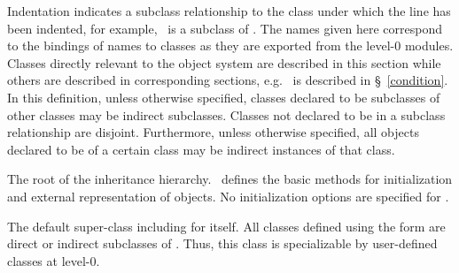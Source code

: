\begin{optDefinition}
\begin{table}
{\begin{tabbing}
    \>\>\>\\
    \> \\
    \>\>\\
    \>\>\\
    \> \\
    \>\>%
\end{tabbing}%
}%
\end{table}%
%
Indentation indicates a subclass relationship to the class under which the line
has been indented, for example, \ is a subclass of
.  The names given here correspond to the bindings of names to
classes as they are exported from the level-0 modules.  Classes directly
relevant to the object system are described in this section while others are
described in corresponding sections, e.g. \ is described in
\S~\ref{condition}.
%
In this definition, unless otherwise specified, classes declared to be
subclasses of other classes may be indirect subclasses. Classes not declared to
be in a subclass relationship are disjoint.  Furthermore, unless otherwise
specified, all objects declared to be of a certain class may be indirect
instances of that class.

%
The root of the inheritance hierarchy. \ defines the basic
methods for initialization and external representation of objects.  No
initialization options are specified for .

%
The default super-class including for itself.  All classes defined using the
 form are direct or indirect subclasses of
.  Thus, this class is specializable by user-defined classes at
level-0.
%
\end{optDefinition}

